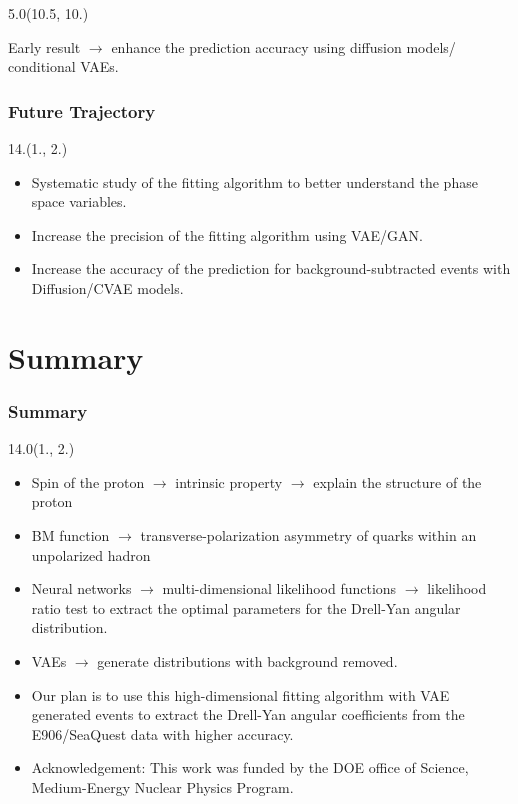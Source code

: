 \documentclass[12pt, xcolor={dvipsnames}, aspectratio = 169, sans,mathserif]{beamer}
\newenvironment{List}[2]
{\begin{textblock}{#1}#2
\begin{itemize}}
{\end{itemize}
\end{textblock}}
\newcommand{\BeamerCite}[1]{{\tiny \footfullcite{#1}}}
\begin{document}
\begin{frame}
\begin{textblock}{5.0}(10.5, 10.)

Early result $\rightarrow$ enhance the prediction accuracy using diffusion models/ conditional VAEs.

\end{textblock}

\end{frame}

\begin{frame}
\frametitle{Future Trajectory}

\begin{List}{14.}{(1., 2.)}

  \item Systematic study of the fitting algorithm to better understand the phase space variables.

  \item Increase the precision of the fitting algorithm using VAE/GAN.\BeamerCite{Diefenbacher:2020rna}

  \item Increase the accuracy of the prediction for background-subtracted events with Diffusion/CVAE models.

\end{List}

\end{frame}

\section{Summary}

\begin{frame}
\frametitle{Summary}

\begin{List}{14.0}{(1., 2.)}

    \item Spin of the proton $\rightarrow$ intrinsic property $\rightarrow$ explain the structure of the proton

    \item BM function $\rightarrow$ transverse-polarization asymmetry of quarks within an unpolarized hadron

    \item Neural networks $\rightarrow$ multi-dimensional likelihood functions $\rightarrow$ likelihood ratio test to extract the optimal parameters for the Drell-Yan angular distribution.

    \item VAEs $\rightarrow$ generate distributions with background removed.

    \item Our plan is to use this high-dimensional fitting algorithm with VAE generated events to extract the Drell-Yan angular coeﬀicients from the E906/SeaQuest data with higher accuracy.

    \item Acknowledgement: This work was funded by the DOE office of Science, Medium-Energy Nuclear Physics Program.

\end{List}
\end{frame}
\end{document}
